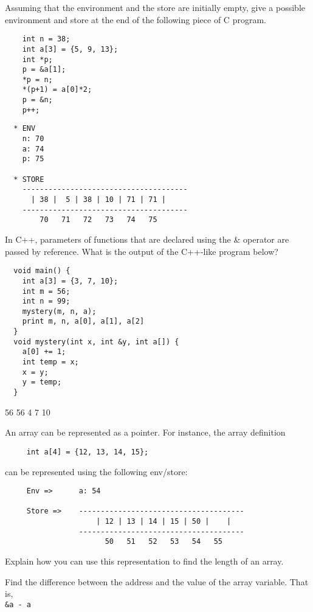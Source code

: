 \documentclass[addpoints]{exam}
\begin{document}
\begin{questions}
  \newpage
  \question
  Assuming that the environment and the store are initially empty,
  give a possible environment and store at the
  end of the following piece of C program.
  \begin{verbatim}
    int n = 38;
    int a[3] = {5, 9, 13};
    int *p;
    p = &a[1];
    *p = n;
    *(p+1) = a[0]*2;
    p = &n;
    p++;
  \end{verbatim}

  \begin{solutionbox}{6cm}
  \begin{verbatim}
  * ENV
    n: 70
    a: 74
    p: 75

  * STORE
    --------------------------------------
      | 38 |  5 | 38 | 10 | 71 | 71 |    
    --------------------------------------
        70   71   72   73   74   75      
  \end{verbatim}
  \end{solutionbox}

  \question
  In C++, parameters of functions that are declared using the 
  \& operator are passed by reference.
  What is the output of the C++-like program below?
  \begin{verbatim}
  void main() {
    int a[3] = {3, 7, 10};
    int m = 56;
    int n = 99;
    mystery(m, n, a);
    print m, n, a[0], a[1], a[2]
  }
  void mystery(int x, int &y, int a[]) {
    a[0] += 1;
    int temp = x;
    x = y;
    y = temp;
  }
  \end{verbatim}

  \begin{solutionbox}{1cm}
  56 56 4 7 10
  \end{solutionbox}

  \newpage
  \question
  An array can be represented as a pointer.
  For instance, the array definition
  \begin{verbatim}
     int a[4] = {12, 13, 14, 15}; \end{verbatim}
  can be represented using the following env/store:
{\small
  \begin{verbatim}
     Env =>      a: 54

     Store =>    --------------------------------------
                     | 12 | 13 | 14 | 15 | 50 |    |    
                 --------------------------------------
                       50   51   52   53   54   55  
  \end{verbatim}}   
  Explain how you can use this representation to find the length
  of an array.

  \begin{solutionbox}{1.5cm}
  Find the difference between the address and the value
  of the array variable. That is,\\
  \texttt{\&a - a}
  \end{solutionbox}


\end{questions}
\end{document}
